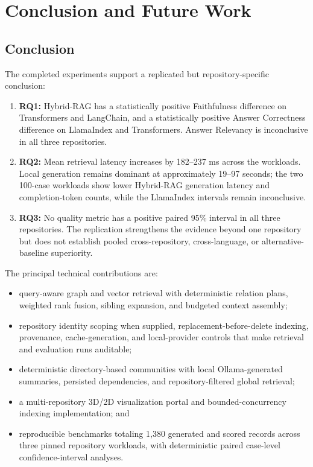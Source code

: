 \documentclass[12pt,letterpaper,oneside]{report}
\begin{document}
\chapter{Conclusion and Future Work}

\section{Conclusion}
The completed experiments support a replicated but repository-specific conclusion:
\begin{enumerate}
    \item \textbf{RQ1:} Hybrid-RAG has a statistically positive Faithfulness difference on Transformers and LangChain, and a statistically positive Answer Correctness difference on LlamaIndex and Transformers. Answer Relevancy is inconclusive in all three repositories.
    \item \textbf{RQ2:} Mean retrieval latency increases by 182--237 ms across the workloads. Local generation remains dominant at approximately 19--97 seconds; the two 100-case workloads show lower Hybrid-RAG generation latency and completion-token counts, while the LlamaIndex intervals remain inconclusive.
    \item \textbf{RQ3:} No quality metric has a positive paired 95\% interval in all three repositories. The replication strengthens the evidence beyond one repository but does not establish pooled cross-repository, cross-language, or alternative-baseline superiority.
\end{enumerate}

The principal technical contributions are:
\begin{itemize}
    \item query-aware graph and vector retrieval with deterministic relation plans, weighted rank fusion, sibling expansion, and budgeted context assembly;
    \item repository identity scoping when supplied, replacement-before-delete indexing, provenance, cache-generation, and local-provider controls that make retrieval and evaluation runs auditable;
    \item deterministic directory-based communities with local Ollama-generated summaries, persisted dependencies, and repository-filtered global retrieval;
    \item a multi-repository 3D/2D visualization portal and bounded-concurrency indexing implementation; and
    \item reproducible benchmarks totaling 1,380 generated and scored records across three pinned repository workloads, with deterministic paired case-level confidence-interval analyses.
\end{itemize}
\end{document}
